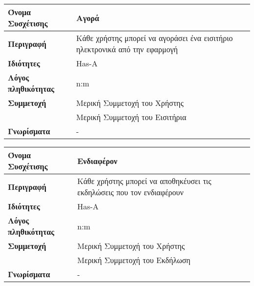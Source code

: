 \begin{center}
\begin{tabular}[]{|p{4cm}|p{10cm}|}
  \hline
  \textbf{Όνομα Συσχέτισης}   & Αγορά                                                                  \\  \hline
  \textbf{Περιγραφή}          & Κάθε χρήστης μπορεί να αγοράσει ένα εισιτήριο ηλεκτρονικά από την εφαρμογή \\ \hline
  \textbf{Ιδιότητες}          & Has-A                                                                  \\ \hline
  \textbf{Λόγος πληθικότητας} & n:m                                                                    \\ \hline
  \textbf{Συμμετοχή}          & Mερική Συμμετοχή του Χρήστης                                           \\ \cline{2-2}
                              & Μερική Συμμετοχή του Εισιτήρια                                          \\ \hline
  \textbf{Γνωρίσματα}         & -                                                                       \\ \hline
\end{tabular}
\vspace{0.3 cm}






\begin{tabular}[]{|p{4cm}|p{10cm}|}
  \hline
  \textbf{Όνομα Συσχέτισης} & Ενδιαφέρον \\  \hline
  \textbf{Περιγραφή} & Κάθε χρήστης μπορεί να αποθηκέυσει τις εκδηλώσεις που τον ενδιαφέρουν \\ \hline
  \textbf{Ιδιότητες} & Has-A \\ \hline
  \textbf{Λόγος πληθικότητας} & n:m \\ \hline
  \textbf{Συμμετοχή} & Mερική Συμμετοχή του Χρήστης \\ \cline{2-2}
                     & Μερική Συμμετοχή του Εκδήλωση \\ \hline
  \textbf{Γνωρίσματα} & - \\ \hline
\end{tabular}
\vspace{0.3 cm}


\end{center}

